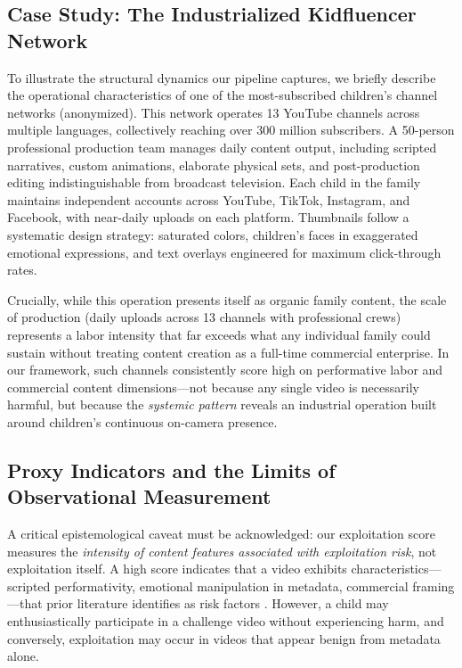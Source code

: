 \documentclass[letterpaper]{article} %
\begin{document}
\subsection{Case Study: The Industrialized Kidfluencer Network}

To illustrate the structural dynamics our pipeline captures, we briefly describe the operational characteristics of one of the most-subscribed children's channel networks (anonymized). This network operates 13 YouTube channels across multiple languages, collectively reaching over 300 million subscribers. A 50-person professional production team manages daily content output, including scripted narratives, custom animations, elaborate physical sets, and post-production editing indistinguishable from broadcast television. Each child in the family maintains independent accounts across YouTube, TikTok, Instagram, and Facebook, with near-daily uploads on each platform. Thumbnails follow a systematic design strategy: saturated colors, children's faces in exaggerated emotional expressions, and text overlays engineered for maximum click-through rates.

Crucially, while this operation presents itself as organic family content, the scale of production (daily uploads across 13 channels with professional crews) represents a labor intensity that far exceeds what any individual family could sustain without treating content creation as a full-time commercial enterprise. In our framework, such channels consistently score high on performative labor and commercial content dimensions---not because any single video is necessarily harmful, but because the \emph{systemic pattern} reveals an industrial operation built around children's continuous on-camera presence.

\subsection{Proxy Indicators and the Limits of Observational Measurement}

A critical epistemological caveat must be acknowledged: our exploitation score measures the \emph{intensity of content features associated with exploitation risk}, not exploitation itself. A high score indicates that a video exhibits characteristics---scripted performativity, emotional manipulation in metadata, commercial framing---that prior literature identifies as risk factors \citep{clark2025child,divon2025children}. However, a child may enthusiastically participate in a challenge video without experiencing harm, and conversely, exploitation may occur in videos that appear benign from metadata alone.
\end{document}
